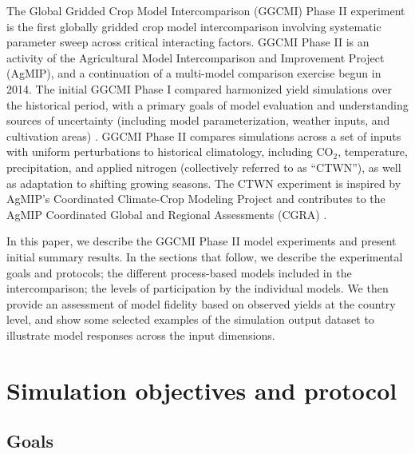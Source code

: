 \documentclass[gmd, manuscript]{copernicus} %
\begin{document}
The Global Gridded Crop Model Intercomparison (GGCMI) Phase II experiment is the first globally gridded crop model intercomparison involving systematic parameter sweep across critical interacting factors.
GGCMI Phase II is an activity of the Agricultural Model Intercomparison and Improvement Project (AgMIP), 
and a continuation of a multi-model comparison exercise begun in 2014. 
The initial GGCMI Phase I compared harmonized yield simulations over the historical period, with a primary goals of model evaluation and understanding sources of uncertainty (including model parameterization, weather inputs, and cultivation areas) \citep{Elliott2015, muller_global_2017, folberth2016, porwollik_spatial_2016}. 
GGCMI Phase II compares simulations across a set of inputs with uniform perturbations to historical climatology,  
including CO$_2$, temperature, precipitation, and applied nitrogen (collectively referred to as ``CTWN''), as well as adaptation to shifting growing seasons. 
The CTWN experiment is inspired by AgMIP's Coordinated Climate-Crop Modeling Project \citep[C3MP][]{ruane2014,mcdermid2015agmip} and contributes to the AgMIP Coordinated Global and Regional Assessments (CGRA) \citep{ruane2018, rosenzweig2018}. 

In this paper, we describe the GGCMI Phase II model experiments and present initial summary results.
In the sections that follow, we describe the experimental goals and protocols; the different process-based models included in the intercomparison; the levels of participation by the individual models. We then provide an assessment of model fidelity based on observed yields at the country level, and show some selected examples of the simulation output dataset to illustrate model responses across the input dimensions.

\section{Simulation objectives and protocol}
\label{S:2}
\subsection{Goals}
\end{document}
